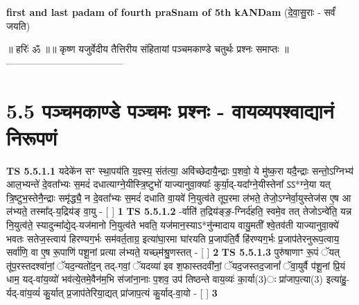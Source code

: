 \documentclass[17pt]{extarticle}
\begin{document}
        \textbf{first and last padam of fourth praSnam of 5th kANDam} \newline
        (दे॒वा॒सु॒राः - सर्वं॑ जयति) \newline 

        
        ॥ हरिः॑ ॐ ॥॥ कृष्ण यजुर्वेदीय तैत्तिरीय संहितायां पञ्चमकाण्डे चतुर्थः प्रश्नः समाप्तः ॥
------------------------------------ \newline
        \pagebreak
                \pagebreak
        
     \section*{ 5.5      पञ्चमकाण्डे पञ्चमः प्रश्नः - वायव्यपश्वाद्यानं निरूपणं }
                                        \textbf{ TS 5.5.1.1} \newline
                  यदेके॑न सꣳ स्था॒पय॑ति य॒ज्ञ्स्य॒ संत॑त्या॒ अवि॑च्छेदायै॒न्द्राः प॒शवो॒ ये मु॑ष्क॒रा यदै॒न्द्राः सन्तो॒ऽग्निभ्य॑ आल॒भ्यन्ते॑ दे॒वता᳚भ्यः स॒मदं॑ दधात्याग्ने॒यीस्त्रि॒ष्टुभो॑ याज्यानुवा॒क्याः᳚ कुर्या॒द्-यदा᳚ग्ने॒यीस्तेना᳚ ऽऽ*ग्ने॒या यत् त्रि॒ष्टुभ॒स्तेनै॒न्द्राः समृ॑द्ध्यै॒ न दे॒वता᳚भ्यः स॒मदं॑ दधाति वा॒यवे॑ नि॒युत्व॑ते तूप॒रमा ल॑भते॒ तेजो॒ऽग्नेर्वा॒युस्तेज॑स ए॒ष आ ल॑भ्यते॒ तस्मा᳚द्-य॒द्रिय॑ङ् वा॒यु - [  ] \textbf{  1} \newline
                  \newline
                                \textbf{ TS 5.5.1.2} \newline
                  -र्वाति॑ त॒द्रिय॑ङ्ङ॒-ग्निर्द॑हति॒ स्वमे॒व तत् तेजोऽन्वे॑ति॒ यन्न नि॒युत्व॑ते॒ स्यादुन्मा᳚द्ये॒द्-यज॑मानो नि॒युत्व॑ते भवति॒ यज॑मान॒स्याऽ*नु॑न्मादाय वायु॒मती᳚ श्वे॒तव॑ती याज्यानुवा॒क्ये॑ भवतः सतेज॒स्त्वाय॑ हिरण्यग॒र्भः सम॑वर्त॒ताग्र॒ इत्या॑घा॒रमा घा॑रयति प्र॒जाप॑ति॒र्वै हि॑रण्यग॒र्भः प्र॒जाप॑तेरनुरूप॒त्वाय॒ सर्वा॑णि॒ वा ए॒ष रू॒पाणि॑ पशू॒नां प्रत्या ल॑भ्यते॒ यच्छ्म॑श्रु॒णस्तत् - [  ] \textbf{  2} \newline
                  \newline
                                \textbf{ TS 5.5.1.3} \newline
                  पुरु॑षाणाꣳ रू॒पं ॅयत् तू॑प॒रस्तदश्वा॑नां॒ ॅयद॒न्यतो॑द॒न् तद्-गवां॒ ॅयदव्या॑ इव श॒फास्तदवी॑नां॒ ॅयद॒जस्तद॒जानां᳚ ॅवा॒युर्वै प॑शू॒नां प्रि॒यं धाम॒ यद्-वा॑य॒व्यो॑ भव॑त्ये॒तमे॒वैन॑म॒भि स॑जांना॒नाः प॒शव॒ उप॑ तिष्ठन्ते वाय॒व्यः॑ का॒र्या(3)ः प्रा॑जाप॒त्या(3) इत्या॑हु॒-र्यद्-वा॑य॒व्यं॑ कु॒र्यात् प्र॒जाप॑तेरिया॒द्यत् प्रा॑जाप॒त्यं कु॒र्याद्-वा॒यो - [  ] \textbf{  3} \newline
\end{document}

